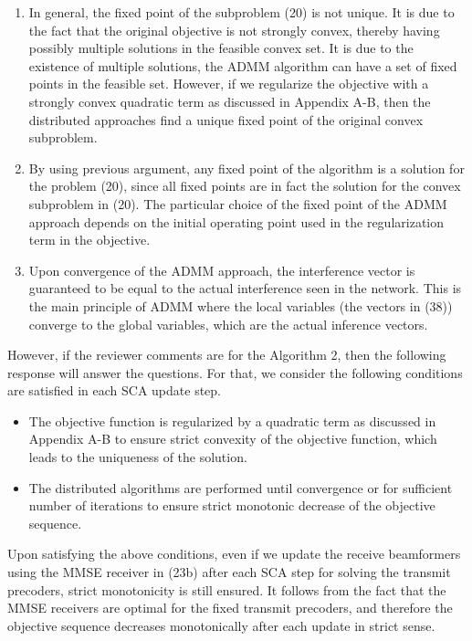 \begin{enumerate}
\begin{enumerate}
\item In general, the fixed point of the subproblem (20) is not unique. It is due to the fact that the original objective is not strongly convex, thereby having possibly multiple solutions in the feasible convex set. It is due to the existence of multiple solutions, the \ac{ADMM} algorithm can have a set of fixed points in the feasible set. However, if we regularize the objective with a strongly convex quadratic term as discussed in Appendix A-B, then the distributed approaches find a unique fixed point of the original convex subproblem.

\item By using previous argument, any fixed point of the algorithm is a solution for the problem (20), since all fixed points are in fact the solution for the convex subproblem in (20). The particular choice of the fixed point of the \ac{ADMM} approach depends on the initial operating point used in the regularization term in the objective.

\item Upon convergence of the \ac{ADMM} approach, the interference vector is guaranteed to be equal to the actual interference seen in the network. This is the main principle of \ac{ADMM} where the local variables (the vectors in (38)) converge to the global variables, which are the actual inference vectors.

\end{enumerate}

However, if the reviewer comments are for the Algorithm 2, then the following response will answer the questions. For that, we consider the following conditions are satisfied in each \ac{SCA} update step.
\begin{itemize}
	\item The objective function is regularized by a quadratic term as discussed in Appendix A-B to ensure strict convexity of the objective function, which leads to the uniqueness of the solution.
	\item The distributed algorithms are performed until convergence or for sufficient number of iterations to ensure strict monotonic decrease of the objective sequence.
\end{itemize}
Upon satisfying the above conditions, even if we update the receive beamformers using the \ac{MMSE} receiver in (23b) after each \ac{SCA} step for solving the transmit precoders, strict monotonicity is still ensured. It follows from the fact that the \ac{MMSE} receivers are optimal for the fixed transmit precoders, and therefore the objective sequence decreases monotonically after each update in strict sense.


\end{enumerate}
